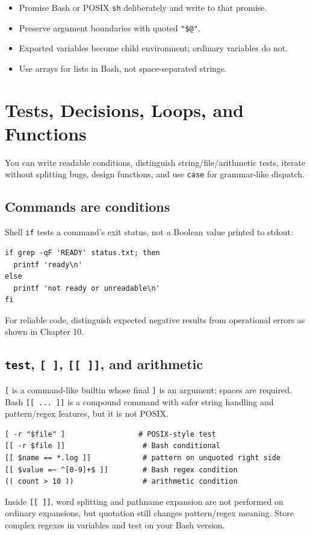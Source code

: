 \documentclass[11pt,oneside,openany]{book}
\newcommand{\chaptergoals}[1]{%
  \begin{tcolorbox}[colback=Paper,colframe=Blue,title={Learning outcomes},fonttitle=\bfseries]
  #1
  \end{tcolorbox}}
\begin{document}
\begin{recapbox}
\begin{itemize}
  \item Promise Bash or POSIX \texttt{sh} deliberately and write to that promise.
  \item Preserve argument boundaries with quoted \texttt{"\$@"}.
  \item Exported variables become child environment; ordinary variables do not.
  \item Use arrays for lists in Bash, not space-separated strings.
\end{itemize}
\end{recapbox}

\chapter{Tests, Decisions, Loops, and Functions}
\chaptergoals{You can write readable conditions, distinguish string/file/arithmetic tests, iterate without splitting bugs, design functions, and use \texttt{case} for grammar-like dispatch.}

\section{Commands are conditions}
Shell \texttt{if} tests a command's exit status, not a Boolean value printed to stdout:
\begin{lstlisting}
if grep -qF 'READY' status.txt; then
  printf 'ready\n'
else
  printf 'not ready or unreadable\n'
fi
\end{lstlisting}
For reliable code, distinguish expected negative results from operational errors as shown in Chapter 10.

\section{\texttt{test}, \texttt{[ ]}, \texttt{[[ ]]}, and arithmetic}
\texttt{[} is a command-like builtin whose final \texttt{]} is an argument; spaces are required. Bash \texttt{[[ ... ]]} is a compound command with safer string handling and pattern/regex features, but it is not POSIX.
\begin{lstlisting}
[ -r "$file" ]                 # POSIX-style test
[[ -r $file ]]                  # Bash conditional
[[ $name == *.log ]]            # pattern on unquoted right side
[[ $value =~ ^[0-9]+$ ]]        # Bash regex condition
(( count > 10 ))                # arithmetic condition
\end{lstlisting}
Inside \texttt{[[ ]]}, word splitting and pathname expansion are not performed on ordinary expansions, but quotation still changes pattern/regex meaning. Store complex regexes in variables and test on your Bash version.
\end{document}

